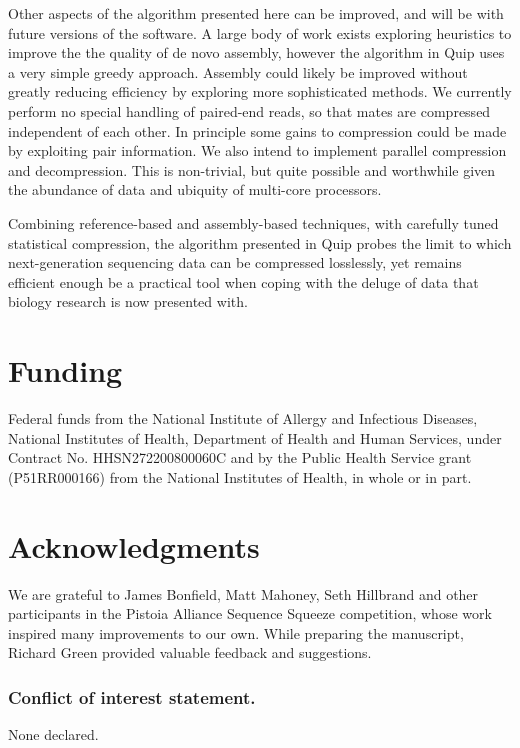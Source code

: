 \documentclass[a4,center,fleqn]{NAR}
\begin{document}
Other aspects of the algorithm presented here can be improved, and will be
with future versions of the software. A large body of work exists exploring
heuristics to improve the the quality of de novo assembly, however the
algorithm in Quip uses a very simple greedy approach. Assembly could likely be
improved without greatly reducing efficiency by exploring more sophisticated
methods. We currently perform no special handling of paired-end reads, so that
mates are compressed independent of each other. In principle some gains to
compression could be made by exploiting pair information. We also intend to
implement parallel compression and decompression. This is non-trivial,
but quite possible and worthwhile given the abundance of data and ubiquity of
multi-core processors.

Combining reference-based and assembly-based techniques, with carefully tuned
statistical compression, the algorithm presented in Quip probes the limit to
which next-generation sequencing data can be compressed losslessly, yet
remains efficient enough be a practical tool when coping with the deluge of
data that biology research is now presented with.


\section{Funding}

Federal funds from the National Institute of Allergy and Infectious Diseases,
National Institutes of Health, Department of Health and Human Services, under
Contract No. HHSN272200800060C and by the Public Health Service grant
(P51RR000166) from the National Institutes of Health, in whole or in part.


\section{Acknowledgments}

We are grateful to James Bonfield, Matt Mahoney, Seth Hillbrand and other
participants in the Pistoia Alliance Sequence Squeeze competition, whose work
inspired many improvements to our own. While preparing the manuscript, Richard
Green provided valuable feedback and suggestions.


\subsubsection{Conflict of interest statement.} None declared.
\newpage



\end{document}
